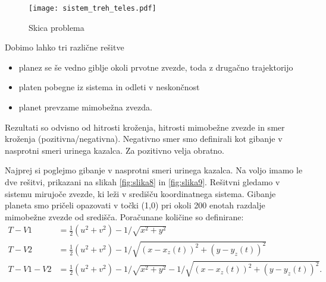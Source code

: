 \documentclass[12pt,a4paper]{article}
\begin{document}
\begin{figure}[H]
    \centering
        \texttt{[image: sistem\_treh\_teles.pdf]}
    \caption{Skica problema} \label{fig:slika7}
\end{figure}

\noindent Dobimo lahko tri različne rešitve
\begin{itemize}
\item planez se še vedno giblje okoli prvotne zvezde, toda z drugačno trajektorijo
\item platen pobegne iz sistema in odleti v neskončnost
\item planet prevzame mimobežna zvezda.
\end{itemize}
Rezultati so odvisno od hitrosti kroženja, hitrosti mimobežne zvezde in smer kroženja (pozitivna/negativna). Negativno smer smo definirali kot gibanje v nasprotni smeri urinega kazalca. Za pozitivno velja obratno.

Najprej si poglejmo gibanje v nasprotni smeri urinega kazalca. Na voljo imamo le dve rešitvi, prikazani na slikah \ref{fig:slika8} in \ref{fig:slika9}. Rešitvni gledamo v sistemu mirujoče zvezde, ki leži v središču koordinatnega sistema. Gibanje planeta smo pričeli opazovati v točki (1,0) pri okoli 200 enotah razdalje mimobežne zvezde od središča. Poračunane količine so definirane:
\begin{align*}
T-V1 &= \frac{1}{2}(u^{2} +v^{2}) - 1/\sqrt{x^{2} +y^{2}} \\
T-V2 &= \frac{1}{2}(u^{2} +v^{2}) - 1/\sqrt{(x-x_z(t))^{2} +(y-y_z(t))^{2}} \\
T- V1 -V2 &=\frac{1}{2}(u^{2} +v^{2}) - 1/\sqrt{x^{2} +y^{2}} - 1/\sqrt{(x-x_z(t))^{2} +(y-y_z(t))^{2}}.
\end{align*}
\end{document}

